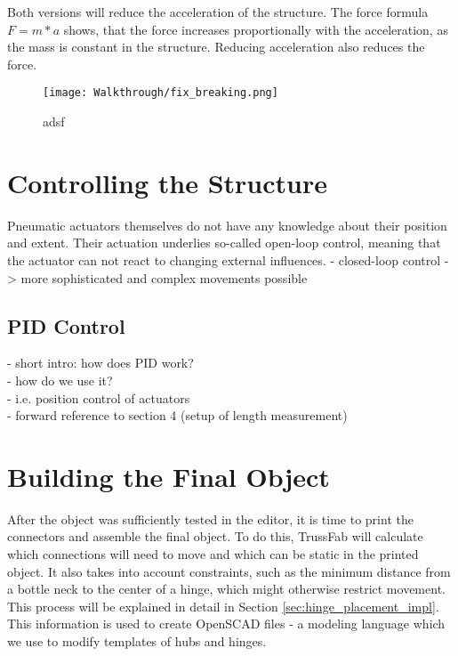 Both versions will reduce the acceleration of the structure. The force formula $F = m * a$ shows, that the force increases proportionally with the acceleration, as the mass is constant in the structure. Reducing acceleration also reduces the force.
\begin{figure}[h!]
    \texttt{[image: Walkthrough/fix\_breaking.png]}
    \centering
    \caption{adsf}
    \label{fig:fix_breaking}
\end{figure}

\section{Controlling the Structure}
Pneumatic actuators themselves do not have any knowledge about their position and extent. Their actuation underlies so-called open-loop control, meaning that the actuator can not react to changing external influences.
- closed-loop control -> more sophisticated and complex movements possible\\

\subsection{PID Control}
- short intro: how does PID work?\\
- how do we use it?\\
- i.e. position control of actuators\\
- forward reference to section 4 (setup of length measurement)\\

\section{Building the Final Object}
After the object was sufficiently tested in the editor, it is time to print the connectors and assemble the final object. To do this, TrussFab will calculate which connections will need to move and which can be static in the printed object. It also takes into account constraints, such as the minimum distance from a bottle neck to the center of a hinge, which might otherwise restrict movement. This process will be explained in detail in Section \ref{sec:hinge_placement_impl}. This information is used to create OpenSCAD files - a modeling language which we use to modify templates of hubs and hinges.

